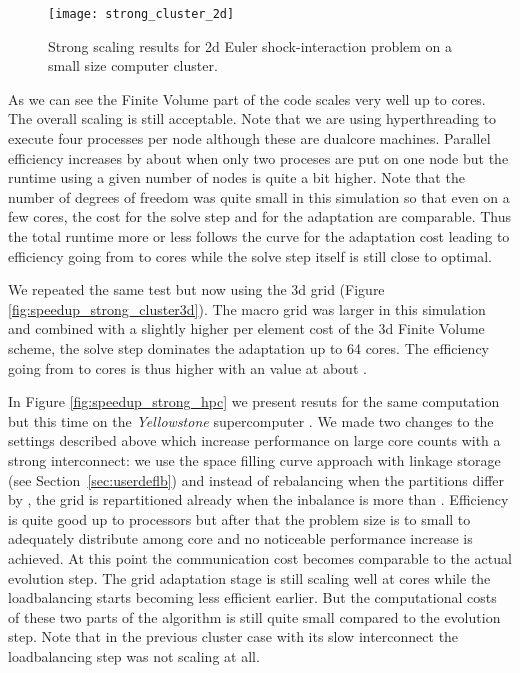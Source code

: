 \documentclass[10pt,notitlepage,a4paper]{article}
\begin{document}
\begin{figure}[!ht]
\begin{center}
  \texttt{[image: strong\_cluster\_2d]}
  \caption{Strong scaling results for 2d Euler shock-interaction problem on a small size
  computer cluster. 
}
  \label{fig:speedup_strong_cluster2d}
\end{center}
\end{figure}  

As we can see the Finite Volume part of the 
code scales very well up to  cores. The overall scaling is still
acceptable. Note that we are using hyperthreading to execute four
processes per node although these are dualcore machines. Parallel
efficiency increases by about  when only two proceses are put on one
node but the runtime using a given number of nodes is quite a bit higher. 
Note that the number of degrees of freedom 
was quite small in this simulation so that even on a
few cores, the cost for the solve step and for the adaptation are comparable. Thus the
total runtime more or less follows the curve for the adaptation cost leading to
 efficiency going from  to  cores while the solve step itself is still
close to optimal.

We repeated the same test but now using the 3d grid (Figure \ref{fig:speedup_strong_cluster3d}). 
The macro grid was larger in this
simulation and combined with a slightly higher per element
cost of the 3d Finite Volume scheme, the solve step dominates the adaptation
up to 64 cores. The efficiency going from  to  cores is thus higher with an
value at about .

In Figure \ref{fig:speedup_strong_hpc} we present resuts for the same
computation but this time on the \emph{Yellowstone} supercomputer
\cite{Yellowstone}. We made two
changes to the settings described above which increase performance on large
core counts with a strong interconnect: we use the space filling curve
approach with linkage storage (see Section~\ref{sec:userdeflb}) and instead of
rebalancing when the partitions differ by , the grid is repartitioned
already when the inbalance is more than .
Efficiency is quite good up to  processors but after that the problem
size is to small to adequately distribute among  core 
and no noticeable performance increase is achieved. At
this point the communication cost becomes comparable to the actual
evolution step. The grid adaptation stage is still scaling well at 
cores while the loadbalancing starts becoming less efficient earlier. But
the computational costs of these two parts of the algorithm is still quite 
small compared to the evolution step. Note that in the previous cluster case with
its slow interconnect the loadbalancing step was not scaling at all. 
\end{document}
